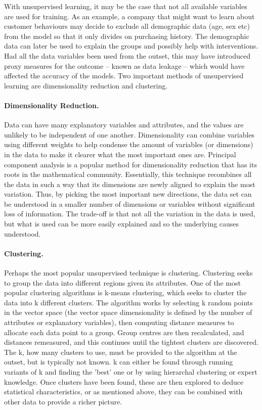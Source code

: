 With unsupervised learning, it may be the case that not all available variables are used for training. As an example, a company that might want to learn about customer behaviours may decide to exclude all demographic data (age, sex etc) from the model so that it only divides on purchasing history. The demographic data can later be used to explain the groups and possibly help with interventions. Had all the data variables been used from the outset, this may have introduced proxy measures for the outcome – known as data leakage – which would have affected the accuracy of the models. Two important methods of unsupervised learning are dimensionality reduction and clustering.


\paragraph{Dimensionality Reduction.} Data can have many explanatory variables and attributes, and the values are unlikely to be independent of one another. Dimensionality can combine variables using different weights to help condense the amount of variables (or dimensions) in the data to make it clearer what the most important ones are. Principal component analysis is a popular method for dimensionality reduction that has its roots in the mathematical community. Essentially, this technique recombines all the data in such a way that its dimensions are newly aligned to explain the most variation. Thus, by picking the most important new directions, the data set can be understood in a smaller number of dimensions or variables without significant loss of information. The trade-off is that not all the variation in the data is used, but what is used can be more easily explained and so the underlying causes understood.


\paragraph{Clustering.} Perhaps the most popular unsupervised technique is clustering. Clustering seeks to group the data into different regions given its attributes. One of the most popular clustering algorithms is k-means clustering, which seeks to cluster the data into k different clusters. The algorithm works by selecting k random points in the vector space (the vector space dimensionality is defined by the number of attributes or explanatory variables), then computing distance measures to allocate each data point to a group. Group centres are then recalculated, and distances remeasured, and this continues until the tightest clusters are discovered. The k, how many clusters to use, must be provided to the algorithm at the outset, but is typically not known. k can either be found through running variants of k and finding the ’best’ one or by using hierarchal clustering or expert knowledge. Once clusters have been found, these are then explored to deduce statistical characteristics, or as mentioned above, they can be combined with other data to provide a richer picture.


